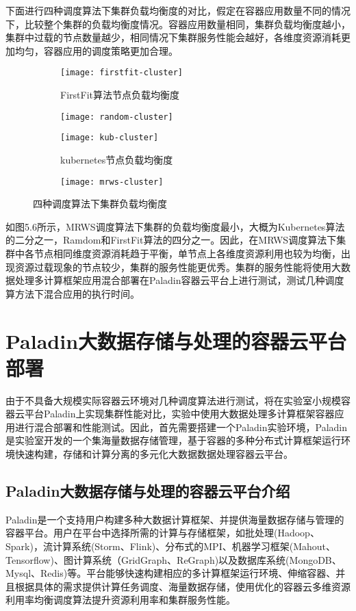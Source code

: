 下面进行四种调度算法下集群负载均衡度的对比，假定在容器应用数量不同的情况下，比较整个集群的负载均衡度情况。容器应用数量相同，集群负载均衡度越小，集群中过载的节点数量越少，相同情况下集群服务性能会越好，各维度资源消耗更加均匀，容器应用的调度策略更加合理。

\begin{figure}[H]
	\centering%
	\begin{subfigure}{7cm}
		\texttt{[image: firstfit-cluster]}
		\caption{FirstFit算法节点负载均衡度}
	\end{subfigure}%
	\hspace{0.5cm}%
	\begin{subfigure}{7cm}
		\texttt{[image: random-cluster]}
	\end{subfigure}
	\begin{subfigure}{7cm}
		\texttt{[image: kub-cluster]}
		\caption{kubernetes节点负载均衡度}
	\end{subfigure}%
	\hspace{0.5cm}%
	\begin{subfigure}{7cm}
		\texttt{[image: mrws-cluster]}
	\end{subfigure}
	\caption{四种调度算法下集群负载均衡度}	
\end{figure}

如图5.6所示，MRWS调度算法下集群的负载均衡度最小，大概为Kubernetes算法的二分之一，Ramdom和FirstFit算法的四分之一。因此，在MRWS调度算法下集群中各节点相同维度资源消耗趋于平衡，单节点上各维度资源利用也较为均衡，出现资源过载现象的节点较少，集群的服务性能更优秀。集群的服务性能将使用大数据处理多计算框架应用混合部署在Paladin容器云平台上进行测试，测试几种调度算方法下混合应用的执行时间。

\section{Paladin大数据存储与处理的容器云平台部署}
由于不具备大规模实际容器云环境对几种调度算法进行测试，将在实验室小规模容器云平台Paladin上实现集群性能对比，实验中使用大数据处理多计算框架容器应用进行混合部署和性能测试。因此，首先需要搭建一个Paladin实验环境，Paladin是实验室开发的一个集海量数据存储管理，基于容器的多种分布式计算框架运行环境快速构建，存储和计算分离的多元化大数据数据处理容器云平台。
\subsection{Paladin大数据存储与处理的容器云平台介绍}
Paladin是一个支持用户构建多种大数据计算框架、并提供海量数据存储与管理的容器平台。用户在平台中选择所需的计算与存储框架，如批处理(Hadoop、Spark)，流计算系统(Storm、Flink)、分布式的MPI、机器学习框架(Mahout、Tensorflow)、图计算系统（GridGraph、ReGraph)以及数据库系统(MongoDB、Mysql、Redis)等。平台能够快速构建相应的多计算框架运行环境、伸缩容器、并且根据具体的需求提供计算任务调度、海量数据存储，使用优化的容器云多维资源利用率均衡调度算法提升资源利用率和集群服务性能。

